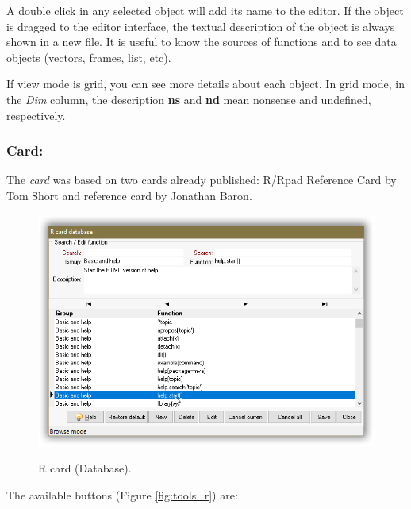 A double click in any selected object will add its name to the editor.
If the object is dragged to the editor interface, the textual description
of the object is always shown in a new file. It is useful to know the
sources of functions and to see data objects (vectors, frames, list, etc).

If view mode is grid, you can see more details about each object. In grid mode,
in the \textit{Dim} column, the description \textbf{ns} and \textbf{nd} mean
nonsense and undefined, respectively.

\subsubsection{Card:}

The \textit{card} was based on two \RR{} cards already published:
R/Rpad Reference Card by Tom Short and \RR{} reference card by Jonathan Baron.

\begin{figure}[H]
  \includegraphics[scale=0.35]{./res/rcard_dlg.png}\\
  \caption{R card (Database).}
  \label{fig:rcard_dlg_2}
\end{figure}

The available buttons
(Figure \ref{fig:tools_r})
are:

